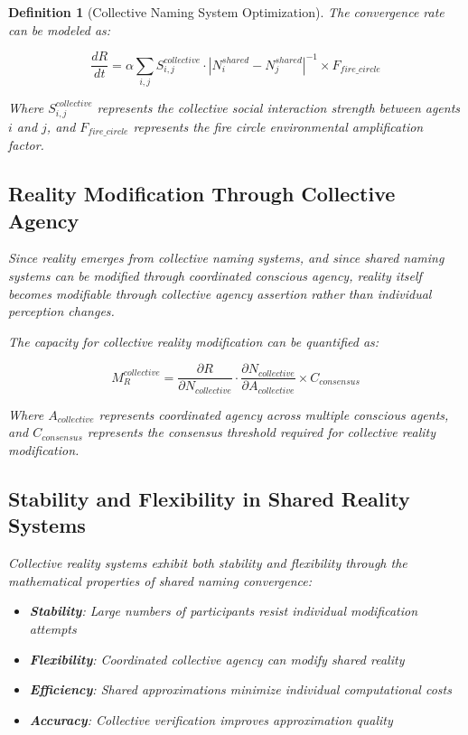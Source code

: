 \documentclass[12pt]{article}
\newtheorem{definition}{Definition}
\begin{document}
\begin{definition}[Collective Naming System Optimization]
The convergence rate can be modeled as:

$$\frac{dR}{dt} = \alpha \sum_{i,j} S_{i,j}^{collective} \cdot |N_i^{shared} - N_j^{shared}|^{-1} \times F_{fire\_circle}$$

Where $S_{i,j}^{collective}$ represents the collective social interaction strength between agents $i$ and $j$, and $F_{fire\_circle}$ represents the fire circle environmental amplification factor.

\subsection{Reality Modification Through Collective Agency}

Since reality emerges from collective naming systems, and since shared naming systems can be modified through coordinated conscious agency, reality itself becomes modifiable through collective agency assertion rather than individual perception changes.

The capacity for collective reality modification can be quantified as:

$$M_R^{collective} = \frac{\partial R}{\partial N_{collective}} \cdot \frac{\partial N_{collective}}{\partial A_{collective}} \times C_{consensus}$$

Where $A_{collective}$ represents coordinated agency across multiple conscious agents, and $C_{consensus}$ represents the consensus threshold required for collective reality modification.

\subsection{Stability and Flexibility in Shared Reality Systems}

Collective reality systems exhibit both stability and flexibility through the mathematical properties of shared naming convergence:

\begin{itemize}
\item \textbf{Stability}: Large numbers of participants resist individual modification attempts
\item \textbf{Flexibility}: Coordinated collective agency can modify shared reality
\item \textbf{Efficiency}: Shared approximations minimize individual computational costs
\item \textbf{Accuracy}: Collective verification improves approximation quality
\end{itemize}


\end{definition}
\end{document}
